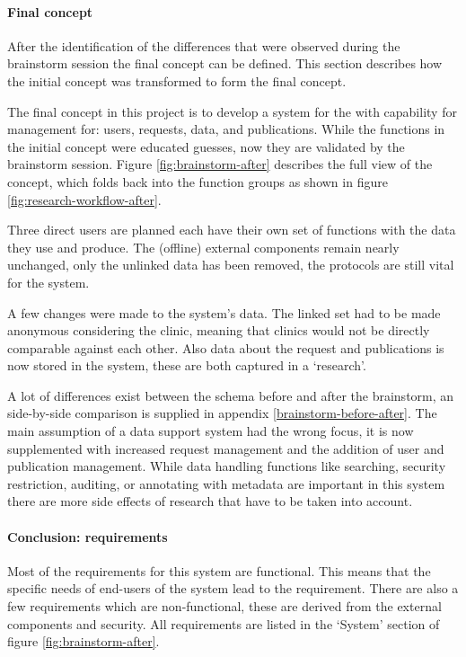 \paragraph{Final concept}

After the identification of the differences that were observed during the brainstorm session the final concept can be defined.
This section describes how the initial concept was transformed to form the final concept.

The final concept in this project is to develop a system for the \projectdata{} with capability for management for: users, requests, data, and publications.
While the functions in the initial concept were educated guesses, now they are validated by the brainstorm session.
Figure \ref{fig:brainstorm-after} describes the full view of the concept, which folds back into the function groups as shown in figure \ref{fig:research-workflow-after}.

Three direct users are planned each have their own set of functions with the data they use and produce.
The (offline) external components remain nearly unchanged, only the unlinked data has been removed, the protocols are still vital for the system.

A few changes were made to the system's data.
The linked set had to be made anonymous considering the clinic, meaning that clinics would not be directly comparable against each other.
Also data about the request and publications is now stored in the system, these are both captured in a `research'.

A lot of differences exist between the schema before and after the brainstorm, an side-by-side comparison is supplied in appendix \ref{brainstorm-before-after}.
The main assumption of a data support system had the wrong focus, it is now supplemented with increased request management and the addition of user and publication management.
While data handling functions like searching, security restriction, auditing, or annotating with metadata are important in this system there are more side effects of research that have to be taken into account.

\paragraph{Conclusion: requirements}
Most of the requirements for this system are functional.
This means that the specific needs of end-users of the system lead to the requirement.
There are also a few requirements which are non-functional, these are derived from the external components and security.
All requirements are listed in the `System' section of figure \ref{fig:brainstorm-after}.


